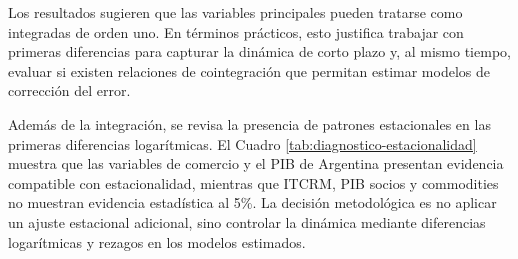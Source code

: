 \documentclass[11pt]{article}
\begin{document}
\begin{table}[H]
\centering
\caption{Pruebas de raíz unitaria y estacionariedad.}
\label{tab:raiz-unitaria-estacionariedad}
\small
{}
\end{table}

Los resultados sugieren que las variables principales pueden tratarse como
integradas de orden uno. En términos prácticos, esto justifica trabajar con
primeras diferencias para capturar la dinámica de corto plazo y, al mismo
tiempo, evaluar si existen relaciones de cointegración que permitan estimar
modelos de corrección del error.

Además de la integración, se revisa la presencia de patrones estacionales en
las primeras diferencias logarítmicas. El Cuadro
\ref{tab:diagnostico-estacionalidad} muestra que las variables de comercio y el
PIB de Argentina presentan evidencia compatible con estacionalidad, mientras
que ITCRM, PIB socios y commodities no muestran evidencia estadística al 5\%.
La decisión metodológica es no aplicar un ajuste estacional adicional, sino
controlar la dinámica mediante diferencias logarítmicas y rezagos en los
modelos estimados.
\end{document}
